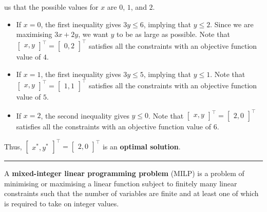 us that the possible values for \(x\) are \(0\), \(1\), and \(2\). \begin{itemize}[noitemsep]
\item If
\(x = 0\), the first inequality gives \(3y \leq 6\), implying that
\(y \leq 2\). Since we are maximising \(3x+2y\), we want \(y\) to be as
large as possible. Note that
\(\begin{bmatrix} x,y \end{bmatrix}^{\!\top} = \begin{bmatrix} 0,2 \end{bmatrix}^{\!\top}\)
satisfies all the constraints with an objective function value of \(4\).
\item If \(x = 1\), the first inequality gives \(3y \leq 5\), implying that
\(y \leq 1\). Note that
\(\begin{bmatrix} x, y \end{bmatrix}^{\!\top} = \begin{bmatrix} 1, 1 \end{bmatrix}^{\!\top}\)
satisfies all the constraints with an objective function value of \(5\).
\item If \(x = 2\), the second inequality gives \(y \leq 0\). Note that
\(\begin{bmatrix} x, y \end{bmatrix}^{\!\top} = \begin{bmatrix} 2, 0 \end{bmatrix}^{\!\top}\)
satisfies all the constraints with an objective function value of \(6\).
\end{itemize}
Thus,
\(\begin{bmatrix} x^*,y^* \end{bmatrix}^{\!\top} = \begin{bmatrix} 2,0 \end{bmatrix}^{\!\top}\)
is an \textbf{optimal solution}.
\begin{center}\rule{0.5\linewidth}{.4pt}\end{center}
A \textbf{mixed-integer linear programming problem} (MILP) is a problem of
minimising or maximising a linear function subject to finitely many
linear constraints such that the number of variables are finite and at
least one of which is required to take on integer values.

